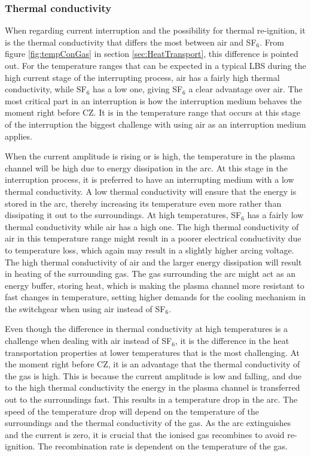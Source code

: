 \documentclass[10pt,a4paper,twoside]{article}
\begin{document}
\subsubsection*{Thermal conductivity}
When regarding current interruption and the possibility for thermal re-ignition, it is the thermal conductivity that differs the most between air and SF$_{6}$. From figure \ref{fig:tempConGas} in section \ref{sec:HeatTransport}, this difference is pointed out. For the temperature ranges that can be expected in a typical LBS during the high current stage of the interrupting process, air has a fairly high thermal conductivity, while SF$_6$ has a low one, giving SF$_6$ a clear advantage over air. The most critical part in an interruption is how the interruption medium behaves the moment right before CZ. It is in the temperature range that occurs at this stage of the interruption the biggest challenge with using air as an interruption medium applies.

When the current amplitude is rising or is high, the temperature in the plasma channel will be high due to energy dissipation in the arc. At this stage in the interruption process, it is preferred to have an interrupting medium with a low thermal conductivity. A low thermal conductivity will ensure that the energy is stored in the arc, thereby increasing its temperature even more rather than dissipating it out to the surroundings. At high temperatures, SF$_6$ has a fairly low thermal conductivity while air has a high one. The high thermal conductivity of air in this temperature range might result in a poorer electrical conductivity due to temperature loss, which again may result in a slightly higher arcing voltage. The high thermal conductivity of air and the larger energy dissipation will result in heating of the surrounding gas. The gas surrounding the arc might act as an energy buffer, storing heat, which is making the plasma channel more resistant to fast changes in temperature, setting higher demands for the cooling mechanism in the switchgear when using air instead of SF$_6$.

Even though the difference in thermal conductivity at high temperatures is a challenge when dealing with air instead of SF$_6$, it is the difference in the heat transportation properties at lower temperatures that is the most challenging. At the moment right before CZ, it is an advantage that the thermal conductivity of the gas is high. This is because the current amplitude is low and falling, and due to the high thermal conductivity the energy in the plasma channel is transferred out to the surroundings fast. This results in a temperature drop in the arc. The speed of the temperature drop will depend on the temperature of the surroundings and the thermal conductivity of the gas. As the arc extinguishes and the current is zero, it is crucial that the ionised gas recombines to avoid re-ignition. The recombination rate is dependent on the temperature of the gas.
 
\end{document}
